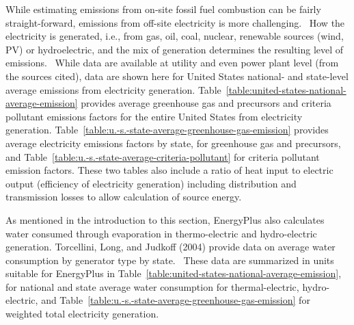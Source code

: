 While estimating emissions from on-site fossil fuel combustion can be fairly straight-forward, emissions from off-site electricity is more challenging.~ How the electricity is generated, i.e., from gas, oil, coal, nuclear, renewable sources (wind, PV) or hydroelectric, and the mix of generation determines the resulting level of emissions.~ While data are available at utility and even power plant level (from the sources cited), data are shown here for United States national- and state-level average emissions from electricity generation. Table~\ref{table:united-states-national-average-emission} provides average greenhouse gas and precursors and criteria pollutant emissions factors for the entire United States from electricity generation. Table~\ref{table:u.-s.-state-average-greenhouse-gas-emission} provides average electricity emissions factors by state, for greenhouse gas and precursors, and Table~\ref{table:u.-s.-state-average-criteria-pollutant} for criteria pollutant emission factors. These two tables also include a ratio of heat input to electric output (efficiency of electricity generation) including distribution and transmission losses to allow calculation of source energy.

As mentioned in the introduction to this section, EnergyPlus also calculates water consumed through evaporation in thermo-electric and hydro-electric generation. Torcellini, Long, and Judkoff (2004) provide data on average water consumption by generator type by state.~ These data are summarized in units suitable for EnergyPlus in Table~\ref{table:united-states-national-average-emission}, for national and state average water consumption for thermal-electric, hydro-electric, and Table~\ref{table:u.-s.-state-average-greenhouse-gas-emission} for weighted total electricity generation.


